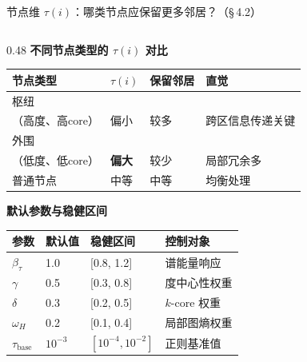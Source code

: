 \documentclass[aspectratio=169,9pt,xcolor=dvipsnames]{beamer}
\newcommand{\highlight}[1]{\textcolor{myred}{\textbf{#1}}}
\newcommand{\blue}[1]{\textcolor{mynavy}{#1}}
\newcommand{\green}[1]{\textcolor{mygreen}{#1}}
\begin{document}
\begin{frame}{节点维 $\tau(i)$：哪类节点应保留更多邻居？（§\,4.2）}
\begin{columns}[T]
\begin{column}{0.48\textwidth}
  \textbf{\blue{不同节点类型的 $\tau(i)$ 对比}}

  \vspace{0.05cm}
  \small
  \begin{tabular}{llll}
    \toprule
    节点类型 & $\tau(i)$ & 保留邻居 & 直觉 \\
    \midrule
    枢纽\\（高度、高core） & \green{偏小} & 较多 & 跨区信息传递关键 \\[4pt]
    外围\\（低度、低core） & \highlight{偏大} & 较少 & 局部冗余多 \\[4pt]
    普通节点 & 中等 & 中等 & 均衡处理 \\
    \bottomrule
  \end{tabular}

  \vspace{0.2cm}
  \textbf{\blue{默认参数与稳健区间}}

  \vspace{0.05cm}
  \small
  \begin{tabular}{llll}
    \toprule
    参数 & 默认值 & 稳健区间 & 控制对象 \\
    \midrule
    $\beta_\tau$ & 1.0 & [0.8, 1.2] & 谱能量响应 \\
    $\gamma$ & 0.5 & [0.3, 0.8] & 度中心性权重 \\
    $\delta$ & 0.3 & [0.2, 0.5] & $k$-core 权重 \\
    $\omega_H$ & 0.2 & [0.1, 0.4] & 局部图熵权重 \\
    $\tau_{\mathrm{base}}$ & $10^{-3}$ & $[10^{-4}, 10^{-2}]$ & 正则基准值 \\
    \bottomrule
  \end{tabular}



\end{column}
\end{columns}
\end{frame}
\end{document}
